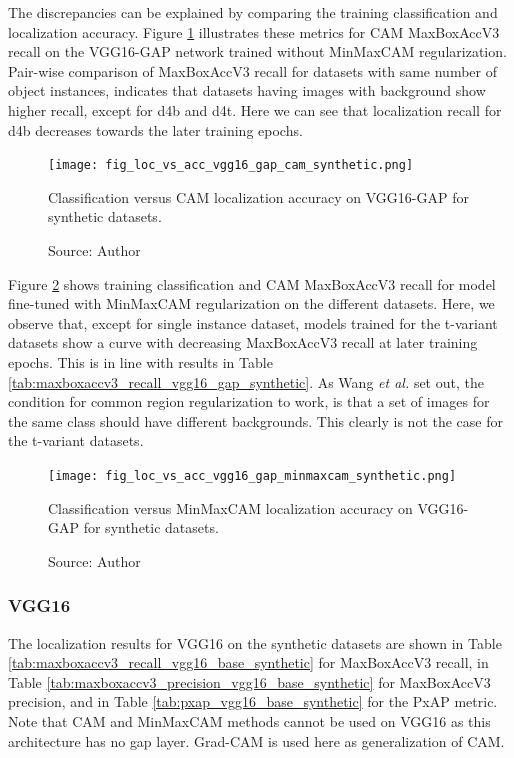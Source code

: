 The discrepancies can be explained by comparing the training classification and localization accuracy. Figure \ref{fig:loc_vs_acc_vgg16_gap_cam_synthetic}  illustrates these metrics for CAM MaxBoxAccV3 recall on the VGG16-GAP network trained without MinMaxCAM regularization. Pair-wise comparison of MaxBoxAccV3 recall for datasets with same number of object instances, indicates that datasets having images with background show higher recall, except for d4b and d4t. Here we can see that localization recall for d4b decreases towards the later training epochs.

\begin{figure}[h]
    \begin{center}       
    \texttt{[image: fig\_loc\_vs\_acc\_vgg16\_gap\_cam\_synthetic.png]}
    \caption[Classification versus CAM localization accuracy on VGG16-GAP for synthetic datasets]{Classification versus CAM localization accuracy on VGG16-GAP for synthetic datasets.}
    \caption*{Source: Author}
    \label{fig:loc_vs_acc_vgg16_gap_cam_synthetic}
    \end{center}
\end{figure}

Figure \ref{fig:loc_vs_acc_vgg16_gap_minmaxcam_synthetic} shows training classification and CAM MaxBoxAccV3 recall for model fine-tuned with MinMaxCAM regularization on the different datasets. Here, we observe that, except for single instance dataset, models trained for the t-variant datasets show a curve with decreasing MaxBoxAccV3 recall at later training epochs. This is in line with results in Table \ref{tab:maxboxaccv3_recall_vgg16_gap_synthetic}. As Wang \textit{et al.} \cite{wang2021minmaxcam} set out, the condition for common region regularization to work, is that a set of images for the same class should have different backgrounds. This clearly is not the case for the t-variant datasets.

\begin{figure}[ht]
    \begin{center}       
    \texttt{[image: fig\_loc\_vs\_acc\_vgg16\_gap\_minmaxcam\_synthetic.png]}
    \caption[Classification versus MinMaxCAM localization accuracy on VGG16-GAP for synthetic datasets]{Classification versus MinMaxCAM localization accuracy on VGG16-GAP for synthetic datasets.}
    \caption*{Source: Author}
    \label{fig:loc_vs_acc_vgg16_gap_minmaxcam_synthetic}
    \end{center}
\end{figure}

\subsubsection{VGG16}
The localization results for VGG16 on the synthetic datasets are shown in Table \ref{tab:maxboxaccv3_recall_vgg16_base_synthetic} for MaxBoxAccV3 recall, in Table \ref{tab:maxboxaccv3_precision_vgg16_base_synthetic} for MaxBoxAccV3 precision, and in Table \ref{tab:pxap_vgg16_base_synthetic} for the PxAP metric. Note that CAM and MinMaxCAM methods cannot be used on VGG16 as this architecture has no \acrshort{gap} layer. Grad-CAM is used here as generalization of CAM.

